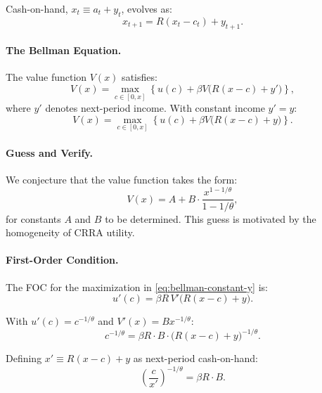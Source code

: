 Cash-on-hand, $x_t \equiv a_t + y_t$, evolves as:
\begin{equation}
x_{t+1} = R(x_t - c_t) + y_{t+1}.
\label{eq:coh-evolution}
\end{equation}

\paragraph{The Bellman Equation.}
The value function $V(x)$ satisfies:
\begin{equation}
V(x) = \max_{c \in [0, x]} \left\{ u(c) + \beta V\bigl(R(x - c) + y'\bigr) \right\},
\label{eq:bellman}
\end{equation}
where $y'$ denotes next-period income. With constant income $y' = y$:
\begin{equation}
V(x) = \max_{c \in [0, x]} \left\{ u(c) + \beta V\bigl(R(x - c) + y\bigr) \right\}.
\label{eq:bellman-constant-y}
\end{equation}

\paragraph{Guess and Verify.}
We conjecture that the value function takes the form:
\begin{equation}
V(x) = A + B \cdot \frac{x^{1 - 1/\theta}}{1 - 1/\theta},
\label{eq:value-guess}
\end{equation}
for constants $A$ and $B$ to be determined. This guess is motivated by the homogeneity of CRRA utility.

\paragraph{First-Order Condition.}
The FOC for the maximization in \cref{eq:bellman-constant-y} is:
\begin{equation}
u'(c) = \beta R \, V'\bigl(R(x - c) + y\bigr).
\label{eq:foc-bellman}
\end{equation}

With $u'(c) = c^{-1/\theta}$ and $V'(x) = B x^{-1/\theta}$:
\begin{equation}
c^{-1/\theta} = \beta R \cdot B \cdot \bigl(R(x - c) + y\bigr)^{-1/\theta}.
\label{eq:foc-explicit}
\end{equation}

Defining $x' \equiv R(x - c) + y$ as next-period cash-on-hand:
\begin{equation}
\left( \frac{c}{x'} \right)^{-1/\theta} = \beta R \cdot B.
\label{eq:foc-ratio}
\end{equation}

